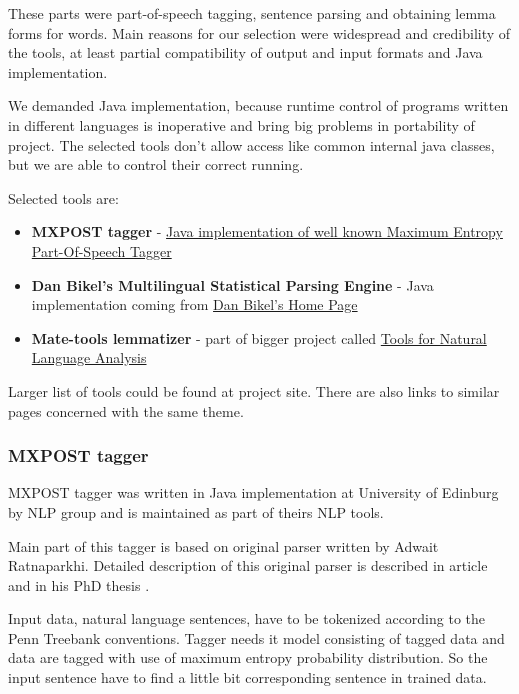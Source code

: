 These parts were part-of-speech tagging, sentence parsing and obtaining lemma forms for words. Main reasons for our selection were widespread  and credibility of the tools, at least partial compatibility of output and input formats and Java implementation. 

We demanded Java implementation, because runtime control of programs written in different languages is inoperative and bring big problems in portability of project. The selected tools don't allow access like common internal java classes, but we are able to control their correct running.

Selected tools are:
 
\begin{itemize}
\item {\bf MXPOST tagger} - \href{http://www.inf.ed.ac.uk/resources/nlp/local_doc/MXPOST.html}{Java implementation of well known Maximum Entropy Part-Of-Speech Tagger}
\item {\bf Dan Bikel's Multilingual Statistical Parsing Engine } - Java implementation coming from \href{http://www.cis.upenn.edu/~dbikel/software.html#stat-parser}{Dan Bikel’s Home Page}
\item {\bf Mate-tools lemmatizer} - part of bigger project called \href{http://code.google.com/p/mate-tools/}{Tools for Natural Language Analysis}
\end{itemize}

Larger list of tools could be found at project site. There are also links to similar pages concerned with the same theme. 
          
\subsubsection{MXPOST tagger} 
MXPOST tagger was written in Java implementation at University of Edinburg by NLP group and is maintained as part of theirs NLP tools.
        
Main part of this tagger is based on original parser written by Adwait Ratnaparkhi. Detailed description of this original parser is described in article \cite{Linguistics-ratnaparkhi96} and in his PhD thesis \cite{Linguistics-ratnaparkhi98}. 

Input data, natural language sentences, have to be tokenized according to the Penn Treebank conventions. Tagger needs it model consisting of tagged data and data are tagged with use of maximum entropy probability distribution. So the input sentence have to find a little bit corresponding sentence in trained data.
  
